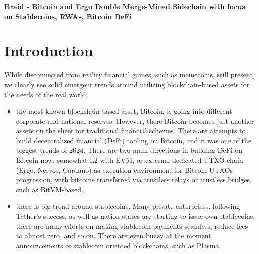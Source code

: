 \documentclass{llncs}   %
\newcommand{\bc}{Braid}
\begin{document}
\begin{center}
  \Large\bfseries\boldmath
  \bc{} - Bitcoin and Ergo Double Merge-Mined Sidechain with focus on Stablecoins, RWAs, Bitcoin DeFi
\end{center}



\section{Introduction}

While disconnected from reality financial games, such as memecoins, still present, we clearly see solid emergent trends around utilizing 
blockchain-based assets for the needs of the real world:

\begin{itemize}
\item{} the most known blockchain-based asset, Bitcoin, is going into different corporate and national reserves. However, there Bitcoin becomes just another assets on the sheet for traditional financial schemes. There are attempts to build decentralized financial (DeFi) tooling on Bitcoin, and it was one of the biggest trends of 2024. There are two main directions in building DeFi on Bitcoin now: somewhat L2 with EVM, or external dedicated UTXO chain (Ergo, Nervos, Cardano) as execution environment for Bitcoin UTXOs progression, with bitcoins transferred via trustless relays or trustless bridges, such as BitVM-based.

\item{} there is big trend around stablecoins. Many private enterprises, following Tether's success, as well as nation states are starting to issue own stablecoins, there are many efforts on making stablecoin payments seamless, reduce fees to almost zero, and so on. There are even buzzy at the moment announcements of stablecoin oriented blockchains, such as Plasma. 
\end{itemize}
\end{document}
